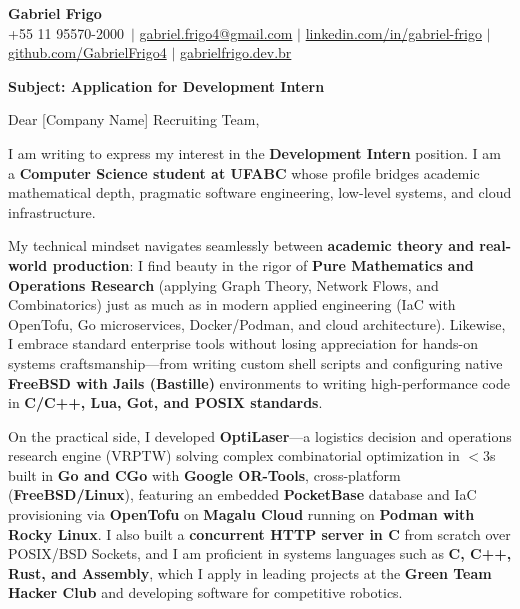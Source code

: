 \documentclass[letterpaper,10pt]{article}
\makeatletter
\newcommand{\candidateName}{Gabriel Frigo}
\newcommand{\candidatePhone}{+55 11 95570-2000}
\newcommand{\candidateEmail}{gabriel.frigo4@gmail.com}
\newcommand{\candidateLinkedInUser}{gabriel-frigo}
\newcommand{\candidateLinkedInURL}{https://linkedin.com/in/gabriel-frigo-b6727b275/}
\newcommand{\candidateGitHubUser}{GabrielFrigo4}
\newcommand{\candidateGitHubURL}{https://github.com/GabrielFrigo4}
\newcommand{\candidateWebsite}{gabrielfrigo.dev.br}
\newcommand{\candidateWebsiteURL}{https://gabrielfrigo.dev.br}
\newcommand{\targetRole}{Development Intern}
\newcommand{\targetCompany}{[Company Name]}
\makeatother
\begin{document}
\begin{center}
  \textbf{\Huge \candidateName} \\ \vspace{4pt}
  \small \candidatePhone\ $|$ \href{mailto:\candidateEmail}{\candidateEmail} $|$
  \href{\candidateLinkedInURL}{linkedin.com/in/\candidateLinkedInUser} $|$
  \href{\candidateGitHubURL}{github.com/\candidateGitHubUser} $|$
  \href{\candidateWebsiteURL}{\candidateWebsite}
\end{center}

\vspace{6pt}

\textbf{Subject: Application for \targetRole}

Dear \targetCompany{} Recruiting Team,

I am writing to express my interest in the \textbf{\targetRole} position. I am a \textbf{Computer Science student at UFABC} whose profile bridges academic mathematical depth, pragmatic software engineering, low-level systems, and cloud infrastructure.

My technical mindset navigates seamlessly between \textbf{academic theory and real-world production}: I find beauty in the rigor of \textbf{Pure Mathematics and Operations Research} (applying Graph Theory, Network Flows, and Combinatorics) just as much as in modern applied engineering (IaC with OpenTofu, Go microservices, Docker/Podman, and cloud architecture). Likewise, I embrace standard enterprise tools without losing appreciation for hands-on systems craftsmanship---from writing custom shell scripts and configuring native \textbf{FreeBSD with Jails (Bastille)} environments to writing high-performance code in \textbf{C/C++, Lua, Got, and POSIX standards}.

On the practical side, I developed \textbf{OptiLaser}---a logistics decision and operations research engine (VRPTW) solving complex combinatorial optimization in $<3$s built in \textbf{Go and CGo} with \textbf{Google OR-Tools}, cross-platform (\textbf{FreeBSD/Linux}), featuring an embedded \textbf{PocketBase} database and IaC provisioning via \textbf{OpenTofu} on \textbf{Magalu Cloud} running on \textbf{Podman with Rocky Linux}. I also built a \textbf{concurrent HTTP server in C} from scratch over POSIX/BSD Sockets, and I am proficient in systems languages such as \textbf{C, C++, Rust, and Assembly}, which I apply in leading projects at the \textbf{Green Team Hacker Club} and developing software for competitive robotics.
\end{document}
